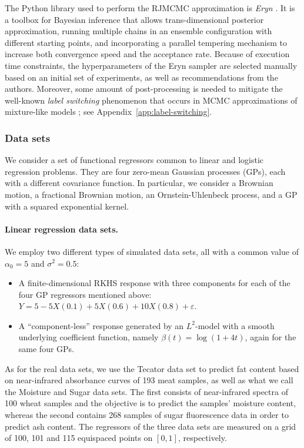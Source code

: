 \documentclass{article}
\numberwithin{equation}{section}
\theoremstyle{plain}
\theoremstyle{definition}
\renewcommand{\epsilon}{\varepsilon}
\begin{document}
The Python library used to perform the RJMCMC approximation is \textit{Eryn} \citep{karnesis2023eryn}. It is a toolbox for Bayesian inference that allows trans-dimensional posterior approximation, running multiple chains in an ensemble configuration with different starting points, and incorporating a parallel tempering mechanism \citep{hukushima1996exchange} to increase both convergence speed and the acceptance rate.  Because of execution time constraints, the hyperparameters of the Eryn sampler are selected manually based on an initial set of experiments, as well as recommendations from the authors.  Moreover, some amount of post-processing is needed to mitigate the well-known \textit{label switching} phenomenon that occurs in MCMC approximations of mixture-like models \citep{stephens2000dealing}; see Appendix~\ref{app:label-switching}.

\subsubsection*{Data sets}

We consider a set of functional regressors common to linear and logistic regression problems. They are four zero-mean Gaussian processes (GPs), each with a different covariance function. In particular, we consider a Brownian motion, a fractional Brownian motion, an Ornstein-Uhlenbeck process, and a GP with a squared exponential kernel.

\paragraph*{Linear regression data sets.} We employ two different types of simulated data sets, all with a common value of \(\alpha_0=5\) and \(\sigma^2=0.5\):
\begin{itemize}
  \item A finite-dimensional RKHS response with three components for each of the four GP regressors mentioned above: \(Y=5 -5X(0.1) + 5X(0.6) + 10X(0.8) + \epsilon\).
  \item A ``component-less'' response generated by an \(L^2\)-model with a smooth underlying coefficient function, namely \(\beta(t)=\log(1+4t)\), again for the same four GPs.
\end{itemize}
As for the real data sets, we use the Tecator data set \citep{borggaard1992optimal} to predict fat content based on near-infrared absorbance curves of 193 meat samples, as well as what we call the Moisture \citep{kalivas1997two} and Sugar \citep{bro1999exploratory} data sets. The first consists of near-infrared spectra of 100 wheat samples and the objective is to predict the samples' moisture content, whereas the second contains 268 samples of sugar fluorescence data in order to predict ash content. The regressors of the three data sets are measured on a grid of 100, 101 and 115 equispaced points on \([0, 1]\), respectively.
\end{document}
